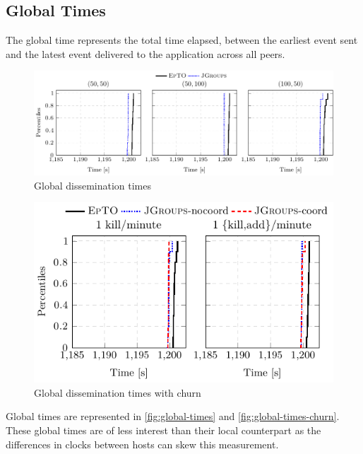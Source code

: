 \subsection{Global Times}
The global time represents the total time elapsed, between the earliest event sent and the latest event delivered to the application across all peers.
 \begin{figure}[hpt]
 	\centering
 	\includegraphics[width=\linewidth]{figures/global-times-nochurn.pdf}
 	\vspace{-2mm} 
 	\caption{Global dissemination times}
 	\vspace{-2mm}
 	\label{fig:global-times}  
 \end{figure}

 \begin{figure}[hpt]
 	\centering
 	\includegraphics[width=\linewidth]{figures/global-times-synth-churn.pdf}
 	\vspace{-2mm} 
 	\caption{Global dissemination times with churn}
 	\vspace{-2mm} 
 	\label{fig:global-times-churn} 
 \end{figure}
Global times are represented in \autoref{fig:global-times} and \autoref{fig:global-times-churn}. These global times are of less interest than their local counterpart as the differences in clocks between hosts can skew this measurement.

